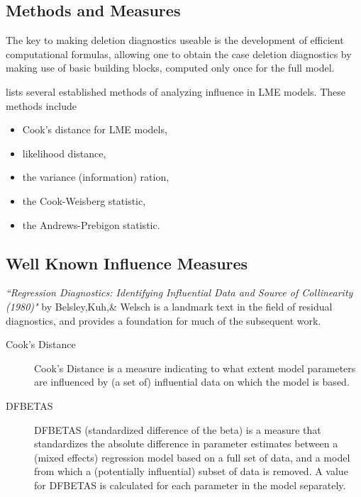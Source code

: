 \documentclass[12pt, a4paper]{report}
\begin{document}
\subsection{Methods and Measures}
The key to making deletion diagnostics useable is the development of efficient computational formulas, allowing one to obtain the  case deletion diagnostics by making use of basic building blocks, computed only once for the full model.


\citet{Zewotir} lists several established methods of analyzing influence in LME models. These methods include \begin{itemize}
	\item Cook's distance for LME models,
	\item {} likelihood distance,
	\item the variance (information) ration,
	\item the  Cook-Weisberg statistic,
	\item the  Andrews-Prebigon statistic.
\end{itemize}


\subsection{Well Known Influence Measures}

\textit{``Regression Diagnostics: Identifying Influential Data
	and Source of Collinearity (1980)"} by Belsley,Kuh,\& Welsch is a landmark text in the field of residual diagnostics, and
provides a foundation for much of the subsequent work.

\begin{description}
	\item[Cook's Distance] Cook’s Distance is a measure indicating to what extent model parameters are influenced by (a set
	of) influential data on which the model is based.
	\item[DFBETAS] DFBETAS (standardized difference of the beta) is a measure that standardizes the absolute difference
	in parameter estimates between a (mixed effects) regression model based on a full set of
	data, and a model from which a (potentially influential) subset of data is removed. A value for
	DFBETAS is calculated for each parameter in the model separately.
\end{description}
			
\end{document}
